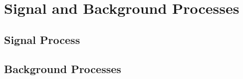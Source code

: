 \chapter{Signal and Background Processes}\label{cha:signal_and_background_processes}

\section{Signal Process}\label{sec:signal_process}

\section{Background Processes}\label{sec:background_processes}
